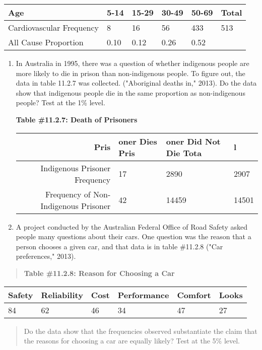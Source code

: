 \documentclass[]{book}
\begin{document}
\begin{longtable}[]{@{}llllll@{}}
\toprule
Age & 5-14 & 15-29 & 30-49 & 50-69 & Total\tabularnewline
\midrule
\endhead
Cardiovascular Frequency & 8 & 16 & 56 & 433 & 513\tabularnewline
All Cause Proportion & 0.10 & 0.12 & 0.26 & 0.52 &\tabularnewline
\bottomrule
\end{longtable}

\begin{enumerate}
\def\labelenumi{\arabic{enumi}.}
\setcounter{enumi}{4}
\item
  In Australia in 1995, there was a question of whether indigenous people are more likely to die in prison than non-indigenous people. To figure out, the data in table 11.2.7 was collected. ("Aboriginal deaths in," 2013). Do the data show that indigenous people die in the same proportion as non-indigenous people? Test at the 1\% level.

  \textbf{Table \#11.2.7: Death of Prisoners}

  \begin{longtable}[]{@{}rlll@{}}
  \toprule
  Pris & oner Dies Pris & oner Did Not Die Tota & l\tabularnewline
  \midrule
  \endhead
  Indigenous Prisoner Frequency & 17 & 2890 & 2907\tabularnewline
  Frequency of Non-Indigenous Prisoner & 42 & 14459 & 14501\tabularnewline
  \bottomrule
  \end{longtable}
\item
  A project conducted by the Australian Federal Office of Road Safety asked people many questions about their cars. One question was the reason that a person chooses a given car, and that data is in table \#11.2.8 ("Car preferences," 2013).
\end{enumerate}

\begin{quote}
\textbf{Table \#11.2.8: Reason for Choosing a Car}
\end{quote}

\begin{longtable}[]{@{}llllll@{}}
\toprule
Safety & Reliability & Cost & Performance & Comfort & Looks\tabularnewline
\midrule
\endhead
84 & 62 & 46 & 34 & 47 & 27\tabularnewline
\bottomrule
\end{longtable}

\begin{quote}
Do the data show that the frequencies observed substantiate the claim that the reasons for choosing a car are equally likely? Test at the 5\% level.
\end{quote}
\end{document}
